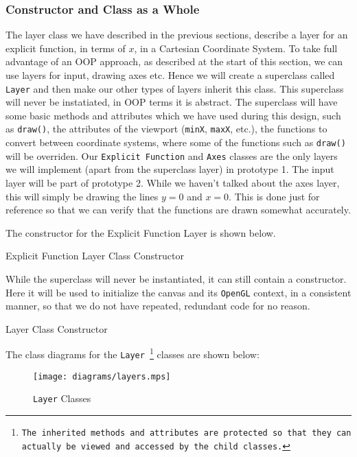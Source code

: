 \documentclass[../../../../../../main.tex]{subfiles}
\begin{document}
\subsubsection{Constructor and Class as a Whole}
The layer class we have described in the previous sections, describe a layer for an explicit function, in terms of $x$, in a Cartesian Coordinate System. To take full advantage of an OOP approach, as described at the start of this section, we can use layers for input, drawing axes etc. Hence we will create a superclass called \texttt{Layer} and then make our other types of layers inherit this class. This superclass will never be instatiated, in OOP terms it is abstract. The superclass will have some basic methods and attributes which we have used during this design, such as \texttt{draw()}, the attributes of the viewport (\texttt{minX}, \texttt{maxX}, etc.), the functions to convert between coordinate systems, where some of the functions such as \texttt{draw()} will be overriden. Our \texttt{Explicit Function} and \texttt{Axes} classes are the only layers we will implement (apart from the superclass layer) in prototype 1. The input layer will be part of prototype 2. While we haven't talked about the axes layer, this will simply be drawing the lines $y=0$ and $x=0$. This is done just for reference so that we can verify that the functions are drawn somewhat accurately.

The constructor for the Explicit Function Layer is shown below.

\begin{algorithm}[H]
\DontPrintSemicolon
\caption{Explicit Function Layer Class Constructor}
\end{algorithm}

While the superclass will never be instantiated, it can still contain a constructor. Here it will be used to initialize the canvas and its \texttt{OpenGL} context, in a consistent manner, so that we do not have repeated, redundant code for no reason.

\begin{algorithm}[H]
\DontPrintSemicolon
\caption{Layer Class Constructor}
\end{algorithm}

The class diagrams for the \texttt{Layer
\footnote{The inherited methods and attributes are protected so that they can actually be viewed and accessed by the child classes.}}
 classes are shown below:
\begin{figure}[H]
	\centering
	\texttt{[image: diagrams/layers.mps]}
	\caption{\texttt{Layer} Classes}
\end{figure}

\newpage
\end{document}
